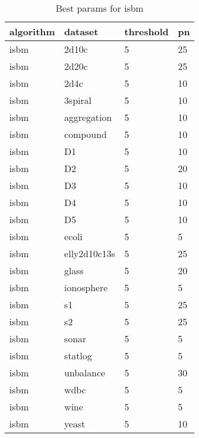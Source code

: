 \clearpage

\begin{table}[H]
\centering
\caption{Best params for isbm}
\label{S29_Table}
\begin{tabular}{|l|l|l|l|}
\hline
algorithm & dataset & threshold & pn \\
\hline
isbm & 2d10c & 5 & 25 \\
\hline
isbm & 2d20c & 5 & 25 \\
\hline
isbm & 2d4c & 5 & 10 \\
\hline
isbm & 3spiral & 5 & 10 \\
\hline
isbm & aggregation & 5 & 10 \\
\hline
isbm & compound & 5 & 10 \\
\hline
isbm & D1 & 5 & 10 \\
\hline
isbm & D2 & 5 & 20 \\
\hline
isbm & D3 & 5 & 10 \\
\hline
isbm & D4 & 5 & 10 \\
\hline
isbm & D5 & 5 & 10 \\
\hline
isbm & ecoli & 5 & 5 \\
\hline
isbm & elly2d10c13s & 5 & 25 \\
\hline
isbm & glass & 5 & 20 \\
\hline
isbm & ionosphere & 5 & 5 \\
\hline
isbm & s1 & 5 & 25 \\
\hline
isbm & s2 & 5 & 25 \\
\hline
isbm & sonar & 5 & 5 \\
\hline
isbm & statlog & 5 & 5 \\
\hline
isbm & unbalance & 5 & 30 \\
\hline
isbm & wdbc & 5 & 5 \\
\hline
isbm & wine & 5 & 5 \\
\hline
isbm & yeast & 5 & 10 \\
\hline
\end{tabular}
\end{table}

\clearpage

